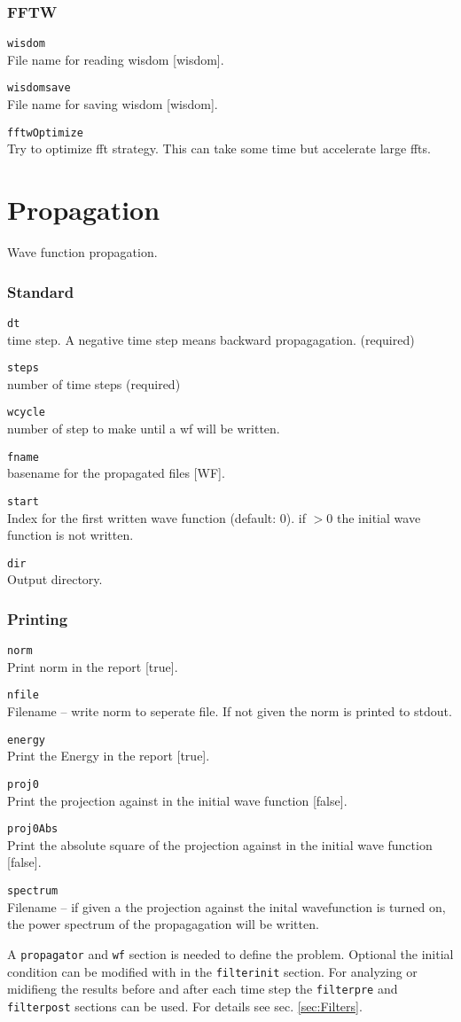 \documentclass[a4paper,12pt]{scrbook}
\newcommand{\option}[2]{\item \texttt{#1}\\ #2}
\begin{document}
\subsubsection{FFTW}
\begin{options}
 \option{wisdom}{File name for reading wisdom [wisdom].}
 \option{wisdomsave}{File name for saving wisdom [wisdom].}
 \option{fftwOptimize}{Try to optimize fft strategy. This can take some time but accelerate large ffts.}
\end{options}


\section{Propagation}
Wave function propagation.
\subsubsection*{Standard}
\begin{options}
\option{dt}{time step. A negative time step means backward propagagation. (required)}
\option{steps}{number of time steps (required)}
\option{wcycle}{number of step to make until a wf will be written.}
\option{fname}{basename for the propagated files [WF].}
\option{start}{Index for the first written wave function (default: 0). if $>0$ the initial wave function is not written.}
\option{dir}{Output directory.}
\end{options}

\subsubsection*{Printing}
\begin{options}
\option{norm}{Print norm in the report [true].}
\option{nfile}{Filename -- write norm to seperate file. If not given the norm is printed to stdout.}
\option{energy}{Print the Energy in the report [true].}
\option{proj0}{Print the projection against in the initial wave function [false].}
\option{proj0Abs}{Print the absolute square of the projection against in the initial wave function [false].}
\option{spectrum}{Filename -- if given a the projection against the inital wavefunction is turned on, the power spectrum of the propagagation will be written.}
\end{options}

A \verb|propagator| and \verb|wf| section is needed to define the problem. Optional the initial condition can
be modified with in the \verb|filterinit| section. For analyzing or midifieng the results before and after each time step
the \verb|filterpre| and \verb|filterpost| sections can be used. For details see sec. \ref{sec:Filters}.
\end{document}
